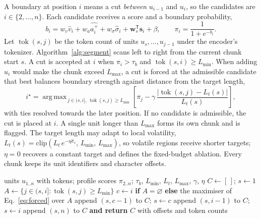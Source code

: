 \documentclass[10pt,a4paper]{article}
\DeclareMathOperator*{\argmax}{arg\,max}
\newcommand{\tok}{\operatorname{tok}}
\begin{document}
A boundary at position $i$ means a cut \emph{between} $u_{i-1}$ and $u_i$, so the candidates are $i\in\{2,\ldots,n\}$. Each candidate receives a score and a boundary probability,
\begin{equation}
b_i = w_v\hat v_i + w_a\widehat{a^+_i} + w_\sigma\hat\sigma_i + \mathbf{w}_s^{\mathsf T}\mathbf{s}_i + \beta, \qquad \pi_i = \frac{1}{1+e^{-b_i}}.
\label{eq:boundary}
\end{equation}
Let $\tok(s,j)$ be the token count of units $u_s,\ldots,u_{j-1}$ under the encoder's tokenizer. Algorithm~\ref{alg:segment} scans left to right from the current chunk start $s$. A cut is accepted at $i$ when $\pi_i>\tau_b$ and $\tok(s,i)\ge L_{\min}$. When adding $u_i$ would make the chunk exceed $L_{\max}$, a cut is forced at the admissible candidate that best balances boundary strength against distance from the target length,
\begin{equation}
i^\star = \argmax_{\,j\in(s,i],\ \tok(s,j)\ge L_{\min}} \left[\pi_j - \gamma\,\frac{|\tok(s,j)-L_t(s)|}{L_t(s)}\right],
\label{eq:forced}
\end{equation}
with ties resolved towards the later position. If no candidate is admissible, the cut is placed at $i$. A single unit longer than $L_{\max}$ forms its own chunk and is flagged. The target length may adapt to local volatility, $L_t(s)=\mathrm{clip}\!\left(L_t\,e^{-\eta\hat\sigma_s},\,L_{\min},\,L_{\max}\right)$, so volatile regions receive shorter targets; $\eta=0$ recovers a constant target and defines the fixed-budget ablation. Every chunk keeps its unit identifiers and character offsets.

\begin{algorithm}[!htbp]
\caption{Reference STP segmentation (indices are unit positions; a cut at $i$ starts a new chunk at $u_i$).}
\label{alg:segment}
\footnotesize
\begin{algorithmic}[1]
\Require units $u_{1..n}$ with tokens; profile scores $\pi_{2..n}$; $\tau_b$, $L_{\min}$, $L_t$, $L_{\max}$, $\gamma$, $\eta$
\State $C\gets[\,]$; $s\gets1$
  \If{$\tok(s,i+1)>L_{\max}$} 
    \State $A\gets\{j\in(s,i]:\tok(s,j)\ge L_{\min}\}$
    \State $c\gets i$ \textbf{if} $A=\varnothing$ \textbf{else} the maximiser of Eq.~\eqref{eq:forced} over $A$
    \State append $(s,c-1)$ to $C$; $s\gets c$
  \ElsIf{$\pi_i>\tau_b$ \textbf{and} $\tok(s,i)\ge L_{\min}$}
    \State append $(s,i-1)$ to $C$; $s\gets i$
  \EndIf
\EndFor
\State append $(s,n)$ to $C$ \textbf{and return} $C$ with offsets and token counts
\end{algorithmic}
\end{algorithm}
\end{document}
